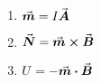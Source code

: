 

\vspace*{\fill}
\centering

\begin{enumerate}
    \item $\va*{m} = I \va*{A}$ 
    \item $\va*{N} = \va*{m} \cross \va*{B}$
    \item $U = - \va*{m} \vdot \va*{B}$
\end{enumerate}

\centering
\vspace*{\fill}

